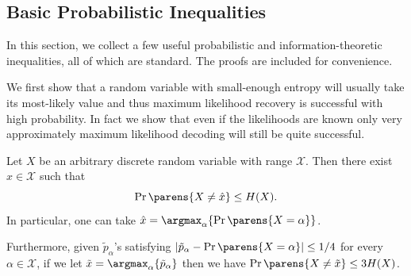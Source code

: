 \documentclass[11pt]{article}
\begin{document}
\subsection{Basic Probabilistic Inequalities}
\label{app:basic-prob}

In this section, we collect a few useful probabilistic and information-theoretic inequalities, all of which are standard. The proofs are included for convenience.

We first show that a random variable with small-enough entropy will usually take its most-likely value  and thus maximum likelihood recovery is successful with high probability. In fact we show that even if the likelihoods are known only very approximately  maximum likelihood decoding will still be quite successful.


\begin{lemma}
	\label{lem:ML-basic}
	Let $X$ be an arbitrary discrete random variable with range $\mathcal{X}$.
	Then there exist $\hat x\in\mathcal{X}$ such that
	$$\Pr\parens{X \neq \hat x} \leq H(X).$$
	In particular, one can take $\hat x = \argmax_\alpha \{\Pr\parens{X=\alpha}\}$.
	
	Furthermore, given $\tilde{p}_\alpha$'s satisfying $|\tilde{p}_\alpha - \Pr\parens{X = \alpha}| \leq 1/4$ for every $\alpha \in \mathcal{X}$, if we let $\tilde{x} = \argmax_\alpha \{\tilde{p}_\alpha \}$ then we have $\Pr\parens{X \neq \tilde{x}} \leq 3H(X)$.
\end{lemma}
\end{document}
